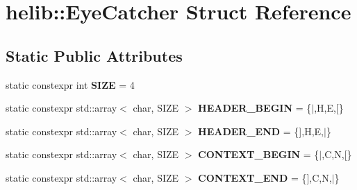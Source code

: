 \hypertarget{structhelib_1_1EyeCatcher}{}\section{helib\+:\+:Eye\+Catcher Struct Reference}
\label{structhelib_1_1EyeCatcher}
\subsection*{Static Public Attributes}
\begin{DoxyCompactItemize}
\item 
\mbox{\label{structhelib_1_1EyeCatcher_aeea57092acda1cecde8584b2312b2dce}} 
static constexpr int {\bfseries S\+I\+ZE} = 4
\item 
\mbox{\label{structhelib_1_1EyeCatcher_a214bc12d239242c63296a06abbffc478}} 
static constexpr std\+::array$<$ char, S\+I\+ZE $>$ {\bfseries H\+E\+A\+D\+E\+R\+\_\+\+B\+E\+G\+IN} = \{\textquotesingle{}$\vert$\textquotesingle{},\textquotesingle{}H\textquotesingle{},\textquotesingle{}E\textquotesingle{},\textquotesingle{}\mbox{[}\textquotesingle{}\}
\item 
\mbox{\label{structhelib_1_1EyeCatcher_a7627debca47e5a0a09cfb1d9b8e1d834}} 
static constexpr std\+::array$<$ char, S\+I\+ZE $>$ {\bfseries H\+E\+A\+D\+E\+R\+\_\+\+E\+ND} = \{\textquotesingle{}\mbox{]}\textquotesingle{},\textquotesingle{}H\textquotesingle{},\textquotesingle{}E\textquotesingle{},\textquotesingle{}$\vert$\textquotesingle{}\}
\item 
\mbox{\label{structhelib_1_1EyeCatcher_a4eb2dde964b69285b4080f8c404aec28}} 
static constexpr std\+::array$<$ char, S\+I\+ZE $>$ {\bfseries C\+O\+N\+T\+E\+X\+T\+\_\+\+B\+E\+G\+IN} = \{\textquotesingle{}$\vert$\textquotesingle{},\textquotesingle{}C\textquotesingle{},\textquotesingle{}N\textquotesingle{},\textquotesingle{}\mbox{[}\textquotesingle{}\}
\item 
\mbox{\label{structhelib_1_1EyeCatcher_ac67d29e224429e8a7d4ab77d6404c39f}} 
static constexpr std\+::array$<$ char, S\+I\+ZE $>$ {\bfseries C\+O\+N\+T\+E\+X\+T\+\_\+\+E\+ND} = \{\textquotesingle{}\mbox{]}\textquotesingle{},\textquotesingle{}C\textquotesingle{},\textquotesingle{}N\textquotesingle{},\textquotesingle{}$\vert$\textquotesingle{}\}

\end{DoxyCompactItemize}
